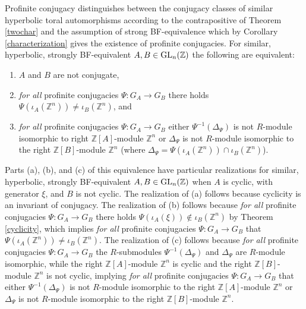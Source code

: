 \documentclass{amsart}
\theoremstyle{plain}
\theoremstyle{definition}
\theoremstyle{remark}
\begin{document}
Profinite conjugacy distinguishes between the conjugacy classes of similar hyperbolic toral automorphisms according to the contrapositive of Theorem \ref{twochar} and the assumption of strong {\rm BF}-equivalence which by Corollary \ref{characterization} gives the existence of profinite conjugacies.  For similar, hyperbolic, strongly {\rm BF}-equivalent $A,B\in {\rm GL}_n({\mathbb Z})$ the following are equivalent:
\begin{enumerate}
\item[(a)] $A$ and $B$ are not conjugate,
\item[(b)] {\it for all} profinite conjugacies $\Psi:G_A\to G_B$ there holds $\Psi(\iota_A({\mathbb Z}^n)) \ne \iota_B({\mathbb Z}^n)$, and
\item[(c)] {\it for all} profinite conjugacies  $\Psi:G_A\to G_B$ either $\Psi^{-1}(\Delta_\Psi)$ is not $R$-module isomorphic to right ${\mathbb Z}[A]$-module ${\mathbb Z}^n$ or $\Delta_\Psi$ is not $R$-module isomorphic to the right ${\mathbb Z}[B]$-module ${\mathbb Z}^n$ (where $\Delta_\Psi = \Psi(\iota_A({\mathbb Z}^n))\cap \iota_B({\mathbb Z}^n)$).
\end{enumerate}

Parts (a), (b), and (c) of this equivalence have particular realizations for similar, hyperbolic, strongly {\rm BF}-equivalent $A,B\in {\rm GL}_n({\mathbb Z})$ when $A$ is cyclic, with generator $\xi$, and $B$ is not cyclic. The realization of (a) follows because cyclicity is an invariant of conjugacy. The realization of (b) follows because {\it for all} profinite conjugacies $\Psi:G_A\to G_B$ there holds $\Psi(\iota_A(\xi)) \not\in \iota_B({\mathbb Z}^n)$ by Theorem \ref{cyclicity}, which implies {\it for all} profinite conjugacies $\Psi:G_A\to G_B$ that $\Psi(\iota_A({\mathbb Z}^n))\ne \iota_B({\mathbb Z}^n)$. The realization of (c) follows because {\it for all} profinite conjugacies $\Psi:G_A\to G_B$ the $R$-submodules $\Psi^{-1}(\Delta_\Psi)$ and $\Delta_\Psi$ are $R$-module isomorphic, while the right ${\mathbb Z}[A]$-module ${\mathbb Z}^n$ is cyclic and the right ${\mathbb Z}[B]$-module ${\mathbb Z}^n$ is not cyclic, implying {\it for all} profinite conjugacies $\Psi:G_A\to G_B$ that either $\Psi^{-1}(\Delta_\Psi)$ is not $R$-module isomorphic to the right ${\mathbb Z}[A]$-module ${\mathbb Z}^n$ or $\Delta_\Psi$ is not $R$-module isomorphic to the right ${\mathbb Z}[B]$-module ${\mathbb Z}^n$.
\end{document}
